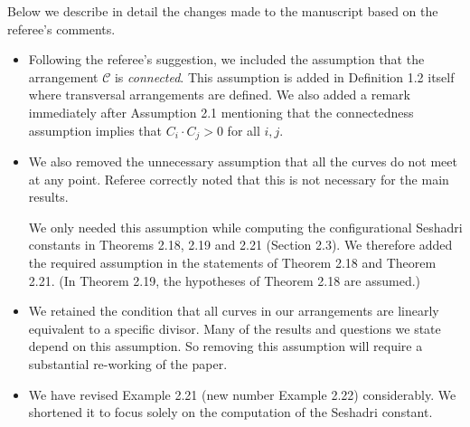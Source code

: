 \documentclass[12pt,twoside,reqno]{amsart}
\numberwithin{equation}{section}
\theoremstyle{definition}
\begin{document}
Below we describe in detail the changes made to the manuscript based on the referee's comments. 
\begin{itemize}
\item Following the referee's suggestion, we included the assumption that the arrangement $\mathcal{C}$ is \textit{connected}. 
This assumption is added in Definition 1.2 itself where transversal arrangements are defined. 
We also added a remark immediately after Assumption 2.1 mentioning that the connectedness assumption implies that $C_i \cdot C_j > 0$ for all $i,j$.

\item We also removed the unnecessary assumption that all the curves do not meet at any point. Referee correctly noted that this is not necessary for the main results. 

We only needed this assumption while computing the configurational Seshadri constants in Theorems 2.18, 2.19 and 2.21 (Section 2.3). We therefore added the required assumption in the statements of Theorem 2.18 and Theorem 2.21. (In Theorem 2.19, the hypotheses of Theorem 2.18 are assumed.)

\item We retained the condition that all curves in our arrangements are linearly equivalent to a specific divisor. Many of the results and questions we state depend on this assumption. So removing this assumption will require a substantial re-working of the paper. 


\item We have revised Example 2.21 (new number Example 2.22) considerably. We shortened it to focus solely on the computation of the Seshadri constant.
\end{itemize}


\end{document}

